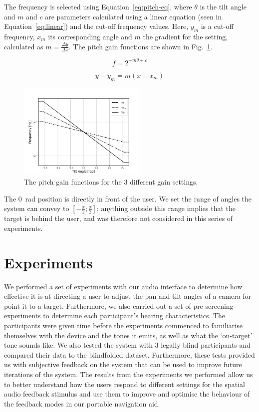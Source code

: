 \documentclass[sigconf, review=true, screen=true, anonymous=true]{acmart}
\begin{document}
The frequency is selected using Equation~\ref{eq:pitch-eq}, where $\theta$ is the tilt angle and $m$ and $c$ are parameters calculated using a linear equation (seen in Equation~\ref{eq:linear}) and the cut-off frequency values. Here, $y_m$ is a cut-off frequency, $x_m$ its corresponding angle and $m$ the gradient for the setting, calculated as $m = \frac{\Delta y}{\Delta x}$. The pitch gain functions are shown in Fig.~\ref{fig:pitch-gain}. 

\begin{equation}
  \label{eq:pitch-eq}
  f = 2^{-m \theta + c}
\end{equation}

\begin{equation}
  \label{eq:linear}
  y - y_m = m(x - x_m)
\end{equation}

\begin{figure}
  \centering
  \includegraphics[width=0.55\textwidth]{figures/pitch_gain_functions.png}
  \caption{The pitch gain functions for the 3 different gain settings. }
  \label{fig:pitch-gain}
\end{figure}

The \SI{0}{\radian} position is directly in front of the user. We set the range of angles the system can convey to $[-\frac{\pi}{2}; \frac{\pi}{2}]$; anything outside this range implies that the target is behind the user, and was therefore not considered in this series of experiments. 

\section{Experiments}
\label{sec:experiments}

We performed a set of experiments with our audio interface to determine how effective it is at directing a user to adjust the pan and tilt angles of a camera for point it to a target. Furthermore, we also carried out a set of pre-screening experiments to determine each participant's hearing characteristics. The participants were given time before the experiments commenced to familiarise themselves with the device and the tones it emits, as well as what the `on-target' tone sounds like. We also tested the system with 3 legally blind participants and compared their data to the blindfolded dataset. Furthermore, these tests provided us with subjective feedback on the system that can be used to improve future iterations of the system. The results from the experiments we performed allow us to better understand how the users respond to different settings for the spatial audio feedback stimulus and use them to improve and optimise the behaviour of the feedback modes in our portable navigation aid.
\end{document}
